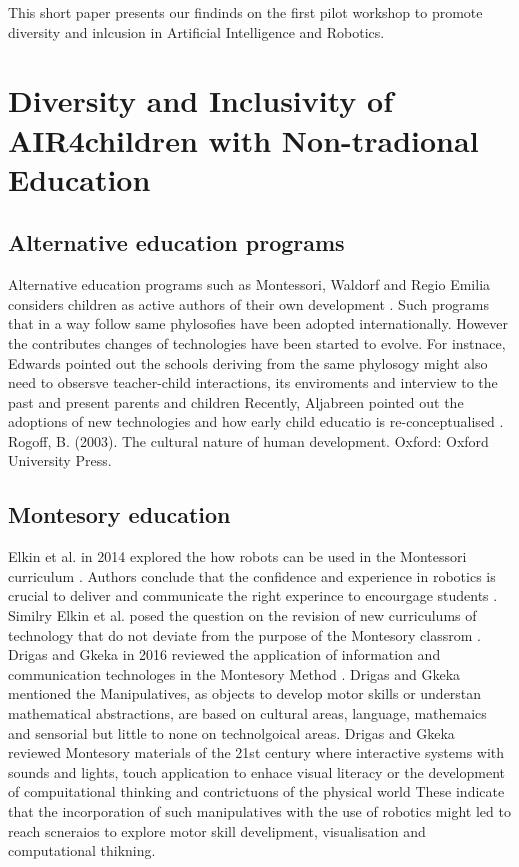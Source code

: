 \documentclass[conference]{IEEEtran}
\begin{document}
This short paper presents our findinds on the first pilot workshop to promote diversity and inlcusion in Artificial Intelligence and Robotics.


\section{Diversity and Inclusivity of AIR4children with Non-tradional Education}

\subsection{Alternative education programs}
Alternative education programs such as Montessori, Waldorf and Regio Emilia considers children as active authors of their own development \cite{edwards2002}.
Such programs that in a way follow same phylosofies have been adopted internationally.
However the contributes changes of technologies have been started to evolve. 
For instnace, Edwards pointed out the schools deriving from the same phylosogy might also need to obsersve teacher-child interactions, its enviroments and interview to the past and present parents and children \cite{edwards2002}
Recently, Aljabreen pointed out the adoptions of new technologies and how early child educatio is re-conceptualised \cite{Aljabreen2020}.
Rogoff, B. (2003). The cultural nature of human development. Oxford: Oxford University Press.

\subsection{Montesory education}
Elkin et al. in 2014 explored the how robots can be used in the Montessori curriculum \cite{elkin2014}.
Authors conclude that the confidence and experience in robotics is crucial to deliver and communicate the right experince to encourgage students \cite{elkin2014}.
Similry Elkin et al. posed the question on the revision of new curriculums of technology that do not deviate from the purpose of the Montesory classrom \cite{elkin2014}.
Drigas and Gkeka in 2016 reviewed the application of information and communication technologes in the Montesory Method \cite{DrigasGkeka2016}.
Drigas and Gkeka mentioned the Manipulatives, as objects to develop motor skills or understan mathematical abstractions, are based on cultural areas, language, mathemaics and sensorial but little to none on technolgoical areas.
Drigas and Gkeka reviewed Montesory materials of the 21st century where interactive systems with sounds and lights, touch application to enhace visual literacy or the development of compuitational thinking and contrictuons of the physical world \cite{DrigasGkeka2016}
These indicate that the incorporation of such manipulatives with the use of robotics might led to reach scneraios to explore motor skill develipment, visualisation and computational thikning. 
\end{document}
